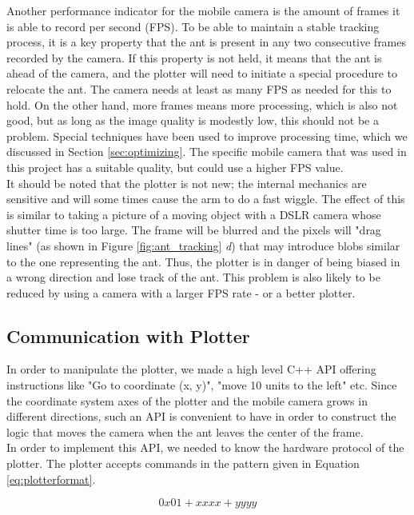 Another performance indicator for the mobile camera is the amount of frames it is able to record per second (FPS). To be able to maintain a stable tracking process, it is a key property that the ant is present in any two consecutive frames recorded by the camera. If this property is not held, it means that the ant is ahead of the camera, and the plotter will need to initiate a special procedure to relocate the ant. The camera needs at least as many FPS as needed for this to hold. On the other hand, more frames means more processing, which is also not good, but as long as the image quality is modestly low, this should not be a problem. Special techniques have been used to improve processing time, which we discussed in Section \ref{sec:optimizing}. The specific mobile camera that was used in this project has a suitable quality, but could use a higher FPS value. \\

It should be noted that the plotter is not new; the internal mechanics are sensitive and will some times cause the arm to do a fast wiggle. The effect of this is similar to taking a picture of a moving object with a DSLR camera whose shutter time is too large. The frame will be blurred and the pixels will "drag lines" (as shown in Figure \ref{fig:ant_tracking} \emph{d}) that may introduce blobs similar to the one representing the ant. Thus, the plotter is in danger of being biased in a wrong direction and lose track of the ant. This problem is also likely to be reduced by using a camera with a larger FPS rate - or a better plotter. \\

\subsection{Communication with Plotter}
In order to manipulate the plotter, we made a high level C++ API offering instructions like "Go to coordinate (x, y)", "move 10 units to the left" etc. Since the coordinate system axes of the plotter and the mobile camera grows in different directions, such an API is convenient to have in order to construct the logic that moves the camera when the ant leaves the center of the frame. \\

In order to implement this API, we needed to know the hardware protocol of the plotter. The plotter accepts commands in the pattern given in Equation \ref{eq:plotterformat}.

\begin{center}
  \begin{equation}
  \label{eq:plotterformat}
    0x01 +  xxxx +  yyyy
  \end{equation}
\end{center}

